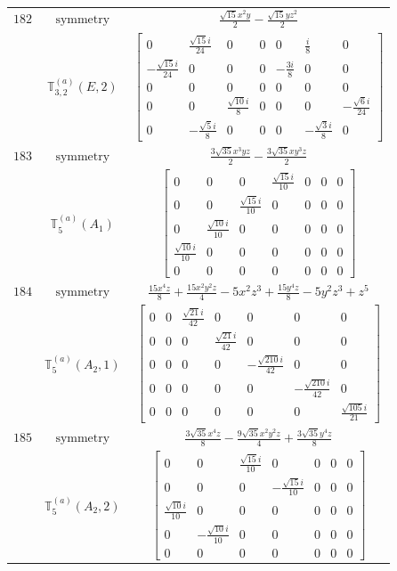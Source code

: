 \documentclass[fleqn,8pt,landscape]{jsarticle}
\begin{document}
\begin{longtable}{ccc}
$ 182 $ & $ \text{symmetry} $ & $ \frac{\sqrt{15} x^{2} y}{2} - \frac{\sqrt{15} y z^{2}}{2} $ \\
$  $ & $ \mathbb{T}_{3,2}^{(a)}(E,2) $ & $ \begin{bmatrix} 0 & \frac{\sqrt{15} i}{24} & 0 & 0 & 0 & \frac{i}{8} & 0 \\ - \frac{\sqrt{15} i}{24} & 0 & 0 & 0 & - \frac{3 i}{8} & 0 & 0 \\ 0 & 0 & 0 & 0 & 0 & 0 & 0 \\ 0 & 0 & \frac{\sqrt{10} i}{8} & 0 & 0 & 0 & - \frac{\sqrt{6} i}{24} \\ 0 & - \frac{\sqrt{5} i}{8} & 0 & 0 & 0 & - \frac{\sqrt{3} i}{8} & 0 \end{bmatrix} $ \\ \hline
$ 183 $ & $ \text{symmetry} $ & $ \frac{3 \sqrt{35} x^{3} y z}{2} - \frac{3 \sqrt{35} x y^{3} z}{2} $ \\
$  $ & $ \mathbb{T}_{5}^{(a)}(A_{1}) $ & $ \begin{bmatrix} 0 & 0 & 0 & \frac{\sqrt{15} i}{10} & 0 & 0 & 0 \\ 0 & 0 & \frac{\sqrt{15} i}{10} & 0 & 0 & 0 & 0 \\ 0 & \frac{\sqrt{10} i}{10} & 0 & 0 & 0 & 0 & 0 \\ \frac{\sqrt{10} i}{10} & 0 & 0 & 0 & 0 & 0 & 0 \\ 0 & 0 & 0 & 0 & 0 & 0 & 0 \end{bmatrix} $ \\ \hline
$ 184 $ & $ \text{symmetry} $ & $ \frac{15 x^{4} z}{8} + \frac{15 x^{2} y^{2} z}{4} - 5 x^{2} z^{3} + \frac{15 y^{4} z}{8} - 5 y^{2} z^{3} + z^{5} $ \\
$  $ & $ \mathbb{T}_{5}^{(a)}(A_{2},1) $ & $ \begin{bmatrix} 0 & 0 & \frac{\sqrt{21} i}{42} & 0 & 0 & 0 & 0 \\ 0 & 0 & 0 & \frac{\sqrt{21} i}{42} & 0 & 0 & 0 \\ 0 & 0 & 0 & 0 & - \frac{\sqrt{210} i}{42} & 0 & 0 \\ 0 & 0 & 0 & 0 & 0 & - \frac{\sqrt{210} i}{42} & 0 \\ 0 & 0 & 0 & 0 & 0 & 0 & \frac{\sqrt{105} i}{21} \end{bmatrix} $ \\ \hline
$ 185 $ & $ \text{symmetry} $ & $ \frac{3 \sqrt{35} x^{4} z}{8} - \frac{9 \sqrt{35} x^{2} y^{2} z}{4} + \frac{3 \sqrt{35} y^{4} z}{8} $ \\
$  $ & $ \mathbb{T}_{5}^{(a)}(A_{2},2) $ & $ \begin{bmatrix} 0 & 0 & \frac{\sqrt{15} i}{10} & 0 & 0 & 0 & 0 \\ 0 & 0 & 0 & - \frac{\sqrt{15} i}{10} & 0 & 0 & 0 \\ \frac{\sqrt{10} i}{10} & 0 & 0 & 0 & 0 & 0 & 0 \\ 0 & - \frac{\sqrt{10} i}{10} & 0 & 0 & 0 & 0 & 0 \\ 0 & 0 & 0 & 0 & 0 & 0 & 0 \end{bmatrix} $ \\ \hline

\end{longtable}
\end{document}
